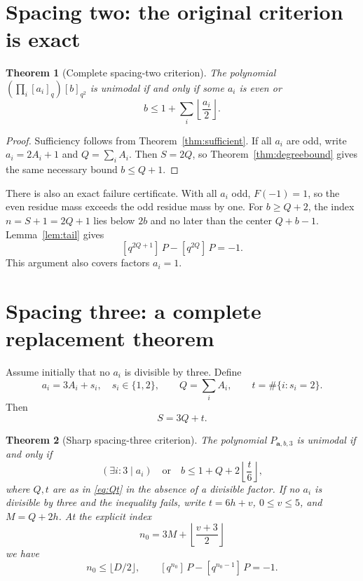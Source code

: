 \documentclass[11pt]{article}
\theoremstyle{research}
\newtheorem{theorem}{Theorem}[section]
\theoremstyle{definition}
\newcommand{\qi}[1]{[#1]_q}
\newcommand{\qir}[2]{[#1]_{q^{#2}}}
\newcommand{\coef}[2]{[q^{#1}]\,#2}
\numberwithin{equation}{section}
\begin{document}
\section{Spacing two: the original criterion is exact}
\label{sec:r2}
\begin{theorem}[Complete spacing-two criterion]\label{thm:r2}
The polynomial $(\prod_i\qi{a_i})\qir b2$ is unimodal if and only if some
$a_i$ is even or
\[
 b\le1+\sum_i\left\lfloor\frac{a_i}{2}\right\rfloor.
\]
\end{theorem}
\begin{proof}
Sufficiency follows from Theorem~\ref{thm:sufficient}.
If all $a_i$ are odd, write $a_i=2A_i+1$ and $Q=\sum_iA_i$.
Then $S=2Q$, so Theorem~\ref{thm:degreebound} gives the same necessary
bound $b\le Q+1$.
\end{proof}

There is also an exact failure certificate. With all $a_i$ odd,
$F(-1)=1$, so the even residue mass exceeds the odd residue mass by one.
For $b\ge Q+2$, the index $n=S+1=2Q+1$ lies below $2b$ and no later than
the center $Q+b-1$. Lemma~\ref{lem:tail} gives
\[
 \coef{2Q+1}P-\coef{2Q}P=-1.
\]
This argument also covers factors $a_i=1$.

\section{Spacing three: a complete replacement theorem}
\label{sec:r3}
Assume initially that no $a_i$ is divisible by three. Define
\begin{equation}\label{eq:Qt}
 a_i=3A_i+s_i,\quad s_i\in\{1,2\},\qquad
 Q=\sum_iA_i,\qquad t=\#\{i:s_i=2\}.
\end{equation}
Then
\begin{equation}\label{eq:SQt}
 S=3Q+t.
\end{equation}

\begin{theorem}[Sharp spacing-three criterion]\label{thm:r3}
The polynomial $P_{\boldsymbol a,b,3}$ is unimodal if and only if
\begin{equation}\label{eq:r3criterion}
 (\exists i\colon3\mid a_i)
 \quad\text{or}\quad
 b\le1+Q+2\left\lfloor\frac t6\right\rfloor,
\end{equation}
where $Q,t$ are as in \eqref{eq:Qt} in the absence of a divisible factor.
If no $a_i$ is divisible by three and the inequality fails, write
$t=6h+v$, $0\le v\le5$, and $M=Q+2h$. At the explicit index
\begin{equation}\label{eq:dropindex}
 n_0=3M+\left\lfloor\frac{v+3}{2}\right\rfloor
\end{equation}
we have
\begin{equation}\label{eq:unitdrop}
 n_0\le\lfloor D/2\rfloor,\qquad
 \coef{n_0}P-\coef{n_0-1}P=-1.
\end{equation}
\end{theorem}
\end{document}
